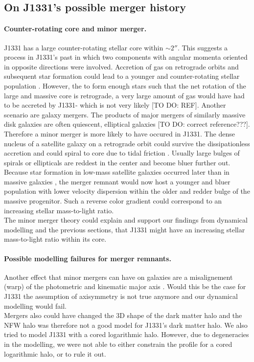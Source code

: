 \subsection{On J1331's possible merger history}

\paragraph{Counter-rotating core and minor merger.} J1331 has a large counter-rotating stellar core within $\sim 2''$. This suggests a process in J1331's past in which two components with angular momenta oriented in opposite directions were involved. Accretion of gas on retrograde orbits and subsequent star formation could lead to a younger and counter-rotating stellar population \Wilma{[TO DO: REF]}. However, the to form enough stars such that the net rotation of the large and massive core is retrograde, a very large amount of gas would have had to be accreted by J1331- which is not very likely [TO DO: REF]. Another scenario are galaxy mergers. The products of major mergers of similarly massive disk galaxies are often quiescent, elliptical galaxies \citep{1972ApJ...178..623T} [TO DO: correct reference???]. Therefore a minor merger is more likely to have occured in J1331. The dense nucleus of a satellite galaxy on a retrograde orbit could survive the dissipationless accretion and could spiral to core due to tidal friction \citep{1984ApJ...287..577K}. Usually large bulges of spirals or ellipticals are reddest in the center and become bluer further out.  Because star formation in low-mass satellite galaxies occurred later than in massive galaxies \Wilma{[TO DO: REF]}, the merger remnant would now host a younger and bluer population with lower velocity dispersion within the older and redder bulge of the massive progenitor. Such a reverse color gradient could correspond to an increasing stellar mass-to-light ratio.
\\The minor merger theory could explain and support our findings from dynamical modelling and the previous sections, that J1331 might have an increasing stellar mass-to-light ratio within its core. 

\paragraph{Possible modelling failures for merger remnants.} Another effect that minor mergers can have on galaxies are a misalignement (warp) of the photometric and kinematic major axis \Wilma{[TO DO: REF]}. Would this be the case for J1331 the assumption of axisymmetry is not true anymore and our dynamical modelling would fail.
\\Mergers also could have changed the 3D shape of the dark matter halo and the NFW halo was therefore not a good model for J1331's dark matter halo. We also tried to model J1331 with a cored logarithmic halo. However, due to degeneracies in the modelling, we were not able to either constrain the profile for a cored logarithmic halo, or to rule it out. 


